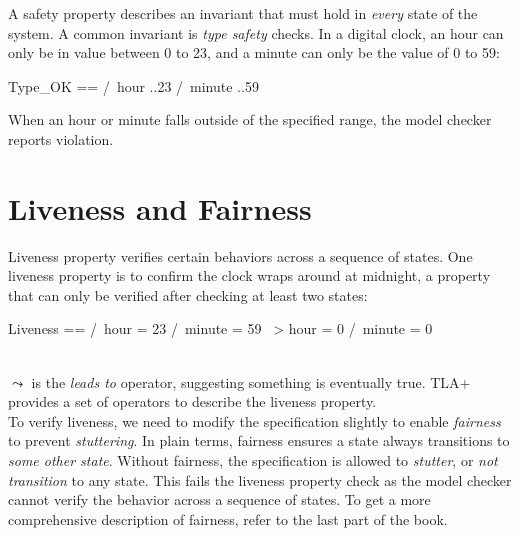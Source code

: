 A safety property describes an invariant that must hold in \textit{every} state
of the system. A common invariant is \textit{type safety} checks. In a digital
clock, an hour can only be in value between 0 to 23, and a minute can only be the value
of 0 to 59:\newline

\begin{tla}
    Type_OK == 
        /\ hour ..23
        /\ minute ..59
\end{tla}
\begin{tlatex}
%
%
%
\end{tlatex}
\newline

When an hour or minute falls outside of the specified range, the model checker 
reports violation.

\section{Liveness and Fairness}

Liveness property verifies certain behaviors across a sequence of states. One
liveness property is to confirm the clock wraps around at midnight, a property
that can only be verified after checking at least two states: \newline

\begin{tla}
    Liveness ==
        /\ hour = 23 /\ minute = 59 ~> hour = 0 /\ minute = 0
\end{tla}
\begin{tlatex}
%
\end{tlatex}
\\

$\leadsto$ is the \textit{leads to} operator, suggesting something is eventually
true. TLA+ provides a set of operators to describe the liveness property.\\

To verify liveness, we need to modify the specification slightly to enable
\textit{fairness} to prevent \textit{stuttering}. In plain terms, fairness
ensures a state always transitions to \textit{some other state}. Without
fairness, the specification is allowed to \textit{stutter}, or \textit{not
transition} to any state. This fails the liveness property check as the model
checker cannot verify the behavior across a sequence of states. To get a more 
comprehensive description of fairness, refer to the last part of the
book.\\


